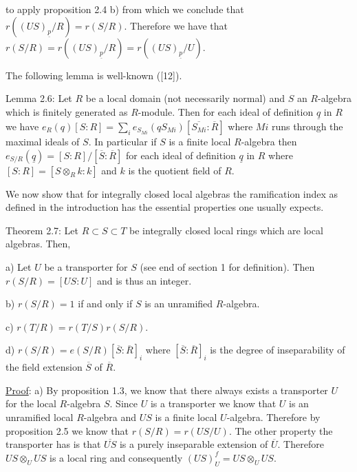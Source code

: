 to apply proposition 2.4 b) from which we conclude that $r((US)_{\underline p}/R)=r(S/R)$.
Therefore we have that $r(S/R)=r((US)_{\underline p}/R)=r((US)_{\underline p}/U)$.

The following lemma is well-known ([12]).

Lemma 2.6: Let $R$ be a local domain (not necessarily normal) and $S$ an
$R$-algebra which is finitely generated as $R$-module. Then for each ideal of
definition $\underline q$ in $R$ we have $e_R(q)[S:R]=\sum_i e_{S_{Mi}}(qS_{Mi})[\overline{S_{Mi}}:\overline R]$ where $Mi$
runs through the maximal ideals of $S$. In particular if $S$ is a finite local
$R$-algebra then $e_{S/R}(\underline q)=[S:R]/[\overline S:\overline R]$ for each ideal of definition $\underline q$
in $R$ where $[S:R]=[S\otimes_R k:k]$ and $k$ is the quotient field of $R$.

We now show that for integrally closed local algebras the ramification
index as defined in the introduction has the essential properties one
usually expects.

Theorem 2.7: Let $R\subset S\subset T$ be integrally closed local rings which are
local algebras. Then,

a) Let $U$ be a transporter for $S$ (see end of section 1 for definition).
Then $r(S/R)=[US:U]$ and is thus an integer.

b) $r(S/R)=1$ if and only if $S$ is an unramified $R$-algebra.

c) $r(T/R)=r(T/S)r(S/R)$.

d) $r(S/R)=e(S/R)[\overline S:\overline R]_i$ where $[\overline S:\overline R]_i$ is the degree of inseparability
of the field extension $\overline S$ of $\overline R$.

\uline{Proof}: a) By proposition 1.3, we know that there always exists a
transporter $U$ for the local $R$-algebra $S$. Since $U$ is a transporter we know
that $U$ is an unramified local $R$-algebra and $US$ is a finite local $U$-algebra.
Therefore by proposition 2.5 we know that $r(S/R)=r(US/U)$. The other
property the transporter has is that $\overline{US}$ is a purely inseparable extension
of $\overline U$. Therefore $US\otimes_U US$ is a local ring and consequently $(US)_U^f=US\otimes_U US$.
